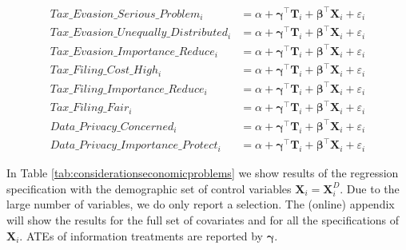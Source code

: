 \documentclass[11pt]{article}
\begin{document}
\begin{center}
\begin{align}
    \label{eq:taxevasionseriousproblem}
    \text{$Tax\_Evasion\_Serious\_Problem_i$} 
    &= \alpha + \boldsymbol{\gamma}^{\top}\mathbf{T}_i + \boldsymbol{\beta}^{\top}\mathbf{X}_{i} + \varepsilon_{i} \\[0.25em]
    \text{$Tax\_Evasion\_Unequally\_Distributed_i$} 
    &= \alpha + \boldsymbol{\gamma}^{\top}\mathbf{T}_i + \boldsymbol{\beta}^{\top}\mathbf{X}_{i} +  \varepsilon_{i} \\[0.25em]
    \text{$Tax\_Evasion\_Importance\_Reduce_i$} 
    &= \alpha + \boldsymbol{\gamma}^{\top}\mathbf{T}_i + \boldsymbol{\beta}^{\top}\mathbf{X}_{i} + \varepsilon_{i} \\[0.25em]
    \text{$Tax\_Filing\_Cost\_High_i$} 
    &= \alpha + \boldsymbol{\gamma}^{\top}\mathbf{T}_i + \boldsymbol{\beta}^{\top}\mathbf{X}_{i} + \varepsilon_{i} \\[0.25em]
    \text{$Tax\_Filing\_Importance\_Reduce_i$} 
    &= \alpha + \boldsymbol{\gamma}^{\top}\mathbf{T}_i + \boldsymbol{\beta}^{\top}\mathbf{X}_{i} + \varepsilon_{i} \\[0.25em]
    \text{$Tax\_Filing\_Fair_i$} 
    &= \alpha + \boldsymbol{\gamma}^{\top}\mathbf{T}_i + \boldsymbol{\beta}^{\top}\mathbf{X}_{i} + \varepsilon_{i} \\[0.25em]
    \text{$Data\_Privacy\_Concerned_i$} 
    &= \alpha + \boldsymbol{\gamma}^{\top}\mathbf{T}_i + \boldsymbol{\beta}^{\top}\mathbf{X}_{i} + \varepsilon_{i} \\[0.25em]
    \label{eq:dataprivacyprotect}
    \text{$Data\_Privacy\_Importance\_Protect_i$} 
    &= \alpha + \boldsymbol{\gamma}^{\top}\mathbf{T}_i + \boldsymbol{\beta}^{\top}\mathbf{X}_{i} + \varepsilon_{i}
\end{align}
\end{center}

In Table \ref{tab:considerationseconomicproblems} we show results of the regression specification with the demographic set of control variables $\mathbf{X}_{i} = \mathbf{X}_{i}^{D}$. Due to the large number of variables, we do only report a selection. The (online) appendix will show the results for the full set of covariates and for all the specifications of $\mathbf{X}_{i}$. ATEs of information treatments are reported by $\boldsymbol{\gamma}$.
\end{document}
